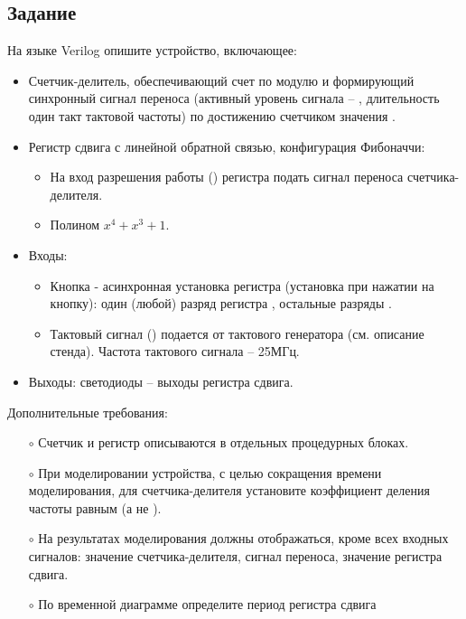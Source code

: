 \subsection{Задание}

На языке Verilog опишите устройство, включающее:
\begin{itemize}
	\item Счетчик-делитель, обеспечивающий счет по модулю  и формирующий синхронный сигнал переноса (активный уровень сигнала -- , длительность один такт тактовой частоты) по достижению счетчиком значения .
	\item Регистр сдвига с линейной обратной связью, конфигурация Фибоначчи:
		\begin{itemize}
			\item На вход разрешения работы () регистра подать сигнал переноса счетчика-делителя.
			\item Полином $x^4 + x^3 + 1$.
		\end{itemize}

	\item Входы:
		\begin{itemize}
			\item Кнопка  - асинхронная установка регистра (установка при нажатии на кнопку): один (любой) разряд регистра , остальные разряды . 	
			\item Тактовый сигнал () подается от тактового генератора (см. описание стенда). Частота тактового сигнала – 25МГц.
		\end{itemize}		
	\item Выходы: светодиоды  -- выходы регистра сдвига.
\end{itemize}

Дополнительные требования:
\begin{itemize}
	\item[$\circ$] Счетчик и регистр описываются в отдельных процедурных блоках.
	\item[$\circ$] При моделировании устройства, с целью сокращения времени моделирования, для счетчика-делителя установите коэффициент деления частоты равным  (а не ).
	\item[$\circ$] На результатах моделирования должны отображаться, кроме всех входных сигналов: значение счетчика-делителя, сигнал переноса, значение регистра сдвига.
	\item[$\circ$] По временной диаграмме определите период регистра сдвига
\end{itemize}

